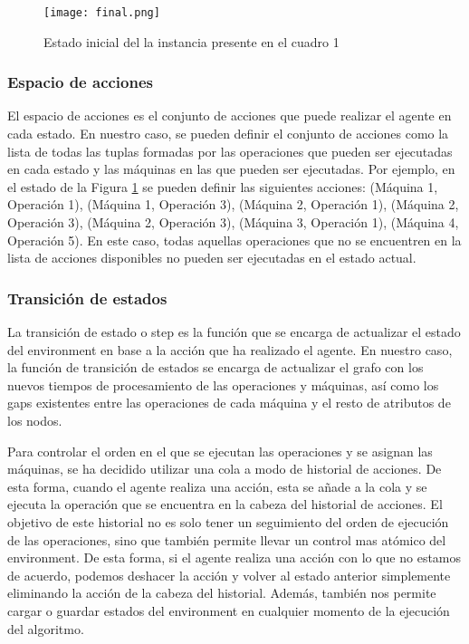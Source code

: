 \begin{figure}[ht]
    \centering
    \texttt{[image: final.png]}
    \caption{Estado inicial del la instancia presente en el cuadro 1}
    \label{fig:final-solution}
\end{figure}

\subsubsection{Espacio de acciones}
El espacio de acciones es el conjunto de acciones que puede realizar el agente en cada estado. 
En nuestro caso, se pueden definir el conjunto de acciones como la lista de todas las tuplas 
formadas por las operaciones que pueden ser ejecutadas en cada estado y las máquinas en las que
pueden ser ejecutadas. Por ejemplo, en el estado de la Figura \ref{fig:final-solution} se pueden
definir las siguientes acciones: (Máquina 1, Operación 1), (Máquina 1, Operación 3), 
(Máquina 2, Operación 1), (Máquina 2, Operación 3), (Máquina 2, Operación 3), (Máquina 3, Operación 1), 
(Máquina 4, Operación 5). En este caso, todas aquellas operaciones que no se encuentren en la lista 
de acciones disponibles no pueden ser ejecutadas en el estado actual.

\subsubsection{Transición de estados}
La transición de estado o step es la función que se encarga de actualizar el estado del environment
en base a la acción que ha realizado el agente. En nuestro caso, la función de transición de estados
se encarga de actualizar el grafo con los nuevos tiempos de procesamiento de las operaciones y máquinas, 
así como los gaps existentes entre las operaciones de cada máquina y el resto de atributos de los nodos.\medskip

Para controlar el orden en el que se ejecutan las operaciones y se asignan las máquinas, se ha
decidido utilizar una cola a modo de historial de acciones. De esta forma, cuando el agente realiza
una acción, esta se añade a la cola y se ejecuta la operación que se encuentra en la cabeza del historial
de acciones. El objetivo de este historial no es solo tener un seguimiento del orden de ejecución de las operaciones, sino
que también permite llevar un control mas atómico del environment. De esta forma, si el agente realiza
una acción con lo que no estamos de acuerdo, podemos deshacer la acción y volver al estado anterior
simplemente eliminando la acción de la cabeza del historial. Además, también nos permite cargar o guardar
estados del environment en cualquier momento de la ejecución del algoritmo.\medskip

